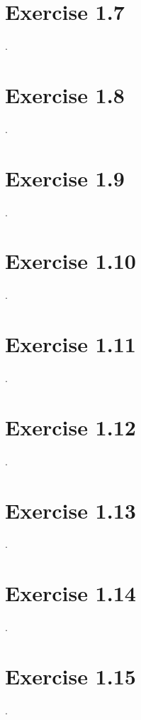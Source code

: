 \section*{Exercise 1.7}
.
\section*{Exercise 1.8}
.
\section*{Exercise 1.9}
.
\section*{Exercise 1.10}
.
\section*{Exercise 1.11}
.
\section*{Exercise 1.12}
.
\section*{Exercise 1.13}
.
\section*{Exercise 1.14}
.
\section*{Exercise 1.15}
.